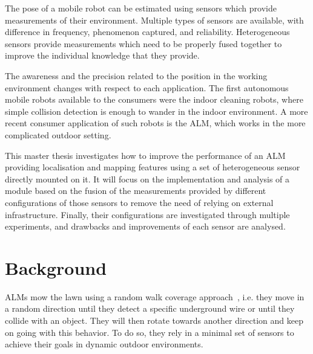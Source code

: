The pose of a mobile robot can be estimated using sensors which provide measurements of their environment.
Multiple types of sensors are available, with difference in frequency, phenomenon captured, and reliability.
Heterogeneous sensors provide measurements which need to be properly fused together to improve the individual knowledge that they provide.

The awareness and the precision related to the position in the working environment changes with respect to each application.
The first autonomous mobile robots available to the consumers were the indoor cleaning robots, where simple collision detection is enough to wander in the indoor environment.
A more recent consumer application of such robots is the \gls{ALM}, which works in the more complicated outdoor setting.

This master thesis investigates how to improve the performance of an \gls{ALM} providing localisation and mapping features using a set of heterogeneous sensor directly mounted on it.
It will focus on the implementation and analysis of a module based on the fusion of the measurements provided by different configurations of those sensors to remove the need of relying on external infrastructure.
Finally, their configurations are investigated through multiple experiments, and drawbacks and improvements of each sensor are analysed.


\section{Background}
\label{sec:background}


\noindent \glspl{ALM} mow the lawn using a random walk coverage approach~\cite{karol_ardic_conditional_2016}, i.e. they move in a random direction until they detect a specific underground wire or until they collide with an object.
They will then rotate towards another direction and keep on going with this behavior.
To do so, they rely in a minimal set of sensors to achieve their goals in dynamic outdoor environments.

